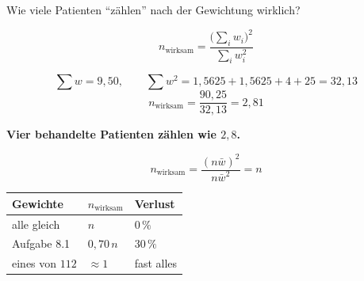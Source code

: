 \begin{aufgabe}
Wie viele Patienten \enquote{zählen} nach der Gewichtung wirklich?

\loesung
{}
\[ n_{\text{wirksam}} = \frac{\bigl(\sum_i w_i\bigr)^{2}}{\sum_i w_i^{2}} \]

\[ \sum w = 9{,}50, \qquad \sum w^{2} = 1{,}5625+1{,}5625+4+25 = 32{,}13 \]
\[ n_{\text{wirksam}} = \frac{90{,}25}{32{,}13} = 2{,}81 \]

\begin{center}
\begin{minipage}{0.9\textwidth}
\textbf{Vier behandelte Patienten zählen wie $2{,}8$.}
\end{minipage}
\end{center}

\[ n_{\text{wirksam}} = \frac{(n\bar w)^{2}}{n\bar w^{2}} = n \]

\begin{center}
{\small
\renewcommand{\arraystretch}{1.48}
\begin{tabular}{@{}P{3.0cm}P{2.4cm}P{2.2cm}@{}}
\toprule
\textbf{Gewichte} & $n_{\text{wirksam}}$ & \textbf{Verlust}\\
\midrule
alle gleich & $n$ & $0\,\%$\\
Aufgabe 8.1 & $0{,}70\,n$ & $30\,\%$\\
eines von $112$ & $\approx 1$ & fast alles\\
\bottomrule
\end{tabular}}
\end{center}

\begin{center}
\begin{minipage}{0.88\textwidth}
\end{minipage}
\end{center}
\end{aufgabe}

